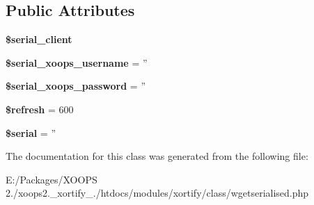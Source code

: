 \subsection*{Public Attributes}
\begin{DoxyCompactItemize}
\item 
\hypertarget{class_w_g_e_t_s_e_r_i_a_l_i_s_e_d_xortify_exchange_a65cdfa324095750649dd54a5ccf7a3b0}{{\bfseries \$serial\-\_\-client}}\label{class_w_g_e_t_s_e_r_i_a_l_i_s_e_d_xortify_exchange_a65cdfa324095750649dd54a5ccf7a3b0}

\item 
\hypertarget{class_w_g_e_t_s_e_r_i_a_l_i_s_e_d_xortify_exchange_ab2a99524a685236c1cdefabc357449c1}{{\bfseries \$serial\-\_\-xoops\-\_\-username} = ''}\label{class_w_g_e_t_s_e_r_i_a_l_i_s_e_d_xortify_exchange_ab2a99524a685236c1cdefabc357449c1}

\item 
\hypertarget{class_w_g_e_t_s_e_r_i_a_l_i_s_e_d_xortify_exchange_aec5a40c6f069ce3c9db0a4c18dffde2a}{{\bfseries \$serial\-\_\-xoops\-\_\-password} = ''}\label{class_w_g_e_t_s_e_r_i_a_l_i_s_e_d_xortify_exchange_aec5a40c6f069ce3c9db0a4c18dffde2a}

\item 
\hypertarget{class_w_g_e_t_s_e_r_i_a_l_i_s_e_d_xortify_exchange_aaaf8bfa309a4ae74e52588cdf7c3b252}{{\bfseries \$refresh} = 600}\label{class_w_g_e_t_s_e_r_i_a_l_i_s_e_d_xortify_exchange_aaaf8bfa309a4ae74e52588cdf7c3b252}

\item 
\hypertarget{class_w_g_e_t_s_e_r_i_a_l_i_s_e_d_xortify_exchange_a6e35af5b87885dd9839ec2213f336bf1}{{\bfseries \$serial} = ''}\label{class_w_g_e_t_s_e_r_i_a_l_i_s_e_d_xortify_exchange_a6e35af5b87885dd9839ec2213f336bf1}

\end{DoxyCompactItemize}


The documentation for this class was generated from the following file\-:\begin{DoxyCompactItemize}
\item 
E\-:/\-Packages/\-X\-O\-O\-P\-S 2./xoops2.\-\_\-xortify\-\_./htdocs/modules/xortify/class/wgetserialised.\-php\end{DoxyCompactItemize}
